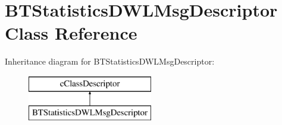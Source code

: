 \hypertarget{classBTStatisticsDWLMsgDescriptor}{}\section{B\+T\+Statistics\+D\+W\+L\+Msg\+Descriptor Class Reference}
\label{classBTStatisticsDWLMsgDescriptor}
Inheritance diagram for B\+T\+Statistics\+D\+W\+L\+Msg\+Descriptor\+:\begin{figure}[H]
\begin{center}
\leavevmode
\includegraphics[height=2.000000cm]{classBTStatisticsDWLMsgDescriptor}
\end{center}
\end{figure}
